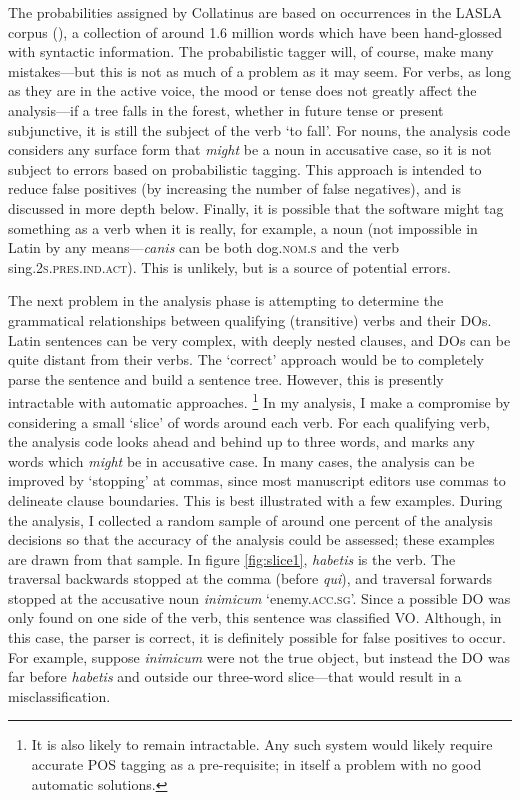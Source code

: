 \documentclass[11pt,a4paper]{scrartcl} %
\begin{document}
\noindent The probabilities assigned by Collatinus are based on occurrences in the LASLA corpus (\cite{lasla}), a collection of around 1.6 million words which have been hand-glossed with syntactic information. The probabilistic tagger will, of course, make many mistakes---but this is not as much of a problem as it may seem. For verbs, as long as they are in the active voice, the mood or tense does not greatly affect the analysis---if a tree falls in the forest, whether in future tense or present subjunctive, it is still the subject of the verb `to fall'. For nouns, the analysis code considers any surface form that \textit{might} be a noun in accusative case, so it is not subject to errors based on probabilistic tagging. This approach is intended to reduce false positives (by increasing the number of false negatives), and is discussed in more depth below. Finally, it is possible that the software might tag something as a verb when it is really, for example, a noun (not impossible in Latin by any means---\textit{canis} can be both dog.\textsc{nom.s} and the verb sing.\textsc{2s.pres.ind.act}). This is unlikely, but is a source of potential errors.

The next problem in the analysis phase is attempting to determine the grammatical relationships between qualifying (transitive) verbs and their DOs. Latin sentences can be very complex, with deeply nested clauses, and DOs can be quite distant from their verbs. The `correct' approach would be to completely parse the sentence and build a sentence tree. However, this is presently intractable with automatic approaches.%
\footnote{It is also likely to remain intractable. Any such system would likely require accurate POS tagging as a pre-requisite; in itself a problem with no good automatic solutions.}
In my analysis, I make a compromise by considering a small `slice' of words around each verb. For each qualifying verb, the analysis code looks ahead and behind up to three words, and marks any words which \textit{might} be in accusative case. In many cases, the analysis can be improved by `stopping' at commas, since most manuscript editors use commas to delineate clause boundaries. This is best illustrated with a few examples. During the analysis, I collected a random sample of around one percent of the analysis decisions so that the accuracy of the analysis could be assessed; these examples are drawn from that sample. In figure \ref{fig:slice1}, \textit{habetis} is the verb. The traversal backwards stopped at the comma (before \textit{qui}), and traversal forwards stopped at the accusative noun \textit{inimicum} `enemy.\textsc{acc.sg}'. Since a possible DO was only found on one side of the verb, this sentence was classified VO. Although, in this case, the parser is correct, it is definitely possible for false positives to occur. For example, suppose \textit{inimicum} were not the true object, but instead the DO was far before \textit{habetis} and outside our three-word slice---that would result in a misclassification.
\end{document}
